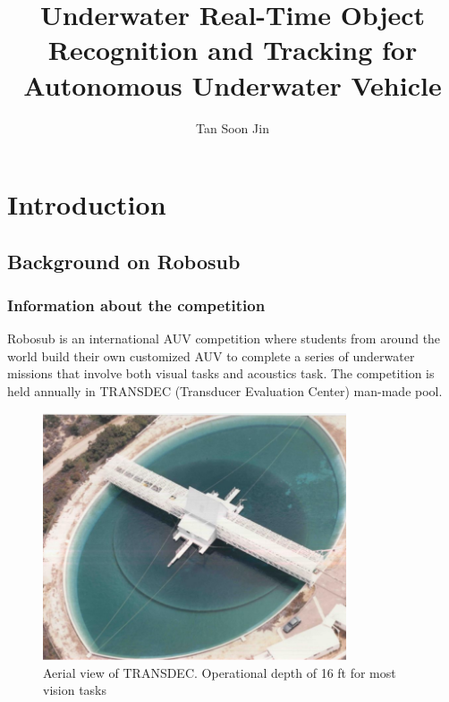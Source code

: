 \documentclass[hyp]{socreport}
\begin{document}
\title{Underwater Real-Time Object Recognition and Tracking for Autonomous Underwater Vehicle}
\author{Tan Soon Jin}

\maketitle



\listoffigures
\listoftables


\chapter{Introduction}

\section{Background on Robosub}

\subsection{Information about the competition}
Robosub is an international AUV competition where students from around
the world build their own customized AUV to complete a series of
underwater missions that involve both visual tasks and acoustics task.
The competition is held annually in TRANSDEC (Transducer Evaluation
Center) man-made pool.

\begin{figure}[ht]
\centering

        \includegraphics[width=0.8\textwidth, height=0.3\textheight]{transdec_aerial.png}
        \caption{Aerial view of TRANSDEC. Operational depth of 16 ft for most vision tasks}
        \label{fig:transdec_aerial}

\end{figure}
\end{document}
